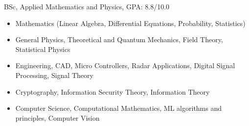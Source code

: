 \documentclass[10pt,a4paper]{cv}
\begin{document}
BSc, Applied Mathematics and Physics,
GPA: 8.8/10.0

\begin{itemize}
\item Mathematics (Linear Algebra, Differential Equations, Probability, Statistics)
\item General Physics, Theoretical and Quantum Mechanics, Field Theory, Statistical Physics
\item Engineering, CAD, Micro Controllers, Radar Applications, Digital Signal Processing, Signal Theory
\item Cryptography, Information Security Theory, Information Theory
\item Computer Science, Computational Mathematics, ML algorithms and principles, Computer Vision
\end{itemize}

\divider



 

\clearpage
\end{document}
